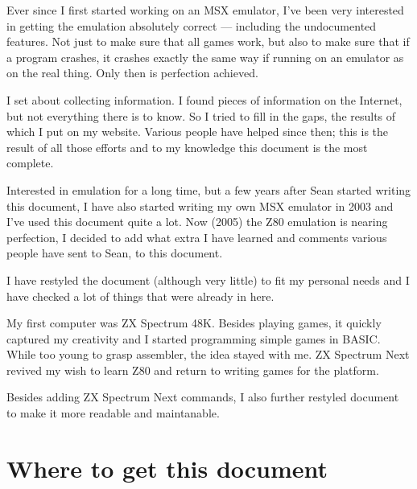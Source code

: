 \documentclass[oneside,a4paper]{book}
\begin{document}
\begin{description}[style=unboxed,leftmargin=0cm]

	\item[Sean]\hfill
	
	Ever since I first started working on an MSX emulator, I've been very interested in getting the emulation absolutely correct --- including the undocumented features. Not just to make sure that all games work, but also to make sure that if a program crashes, it crashes exactly the same way if running on an emulator as on the real thing. Only then is perfection achieved.

	I set about collecting information. I found pieces of information on the Internet, but not everything there is to know. So I tried to fill in the gaps, the results of which I put on my website. Various people have helped since then; this is the result of all those efforts and to my knowledge this document is the most complete.

	\item[Jan]\hfill

	Interested in emulation for a long time, but a few years after Sean started writing this document, I have also started writing my own MSX emulator in 2003 and I've used this document quite a lot. Now (2005) the Z80 emulation is nearing perfection, I decided to add what extra I have learned and comments various people have sent to Sean, to this document.

	I have restyled the document (although very little) to fit my personal needs and I have checked a lot of things that were already in here.

	\item[Tomaz]\hfill
	
	My first computer was ZX Spectrum 48K. Besides playing games, it quickly captured my creativity and I started programming simple games in BASIC. While too young to grasp assembler, the idea stayed with me. ZX Spectrum Next revived my wish to learn Z80 and return to writing games for the platform.
	
	Besides adding ZX Spectrum Next commands, I also further restyled document to make it more readable and maintanable.
 
\end{description}


\section{Where to get this document}
\end{document}
